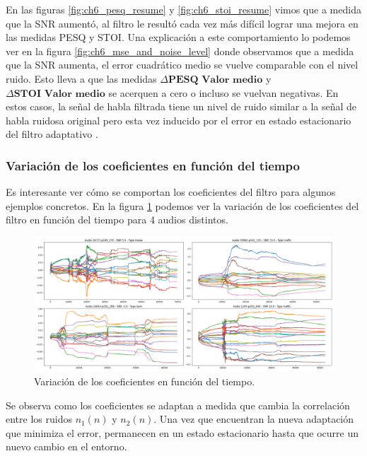En las figuras \ref{fig:ch6_pesq_resume} y \ref{fig:ch6_stoi_resume} vimos que a medida que la SNR aumentó, al filtro le resultó cada vez más difícil lograr una mejora en las medidas PESQ y STOI. Una explicación a este comportamiento lo podemos ver en la figura \ref{fig:ch6_mse_and_noise_level} donde observamos que a medida que la SNR aumenta, el error cuadrático medio se vuelve comparable con el nivel ruido. Esto lleva a que las medidas $\Delta \textbf{PESQ Valor medio}$ y $\Delta \textbf{STOI Valor medio}$ se acerquen a cero o incluso se vuelvan negativas. En estos casos, la señal de habla filtrada tiene un nivel de ruido similar a la señal de habla ruidosa original pero esta vez inducido por el error en estado estacionario del filtro adaptativo \cite{fundamentals_of_adaptive_filtering}.

\subsubsection{Variación de los coeficientes en función del tiempo}

Es interesante ver cómo se comportan los coeficientes del filtro para algunos ejemplos concretos. En la figura \ref{fig:ch6_variacion_temporal_de_coeficientes}  podemos ver la variación de los coeficientes del filtro en función del tiempo para 4 audios distintos. 

\begin{figure}
	\centering
	\centerline{\includegraphics[scale=0.35]{images/ch6/af/weights/weights.png}}
	\caption{Variación de los coeficientes en función del tiempo.}
	\label{fig:ch6_variacion_temporal_de_coeficientes}
\end{figure}

Se observa como los coeficientes se adaptan a medida que cambia la correlación entre los ruidos $n_1(n)$ y $n_2(n)$. Una vez que encuentran la nueva adaptación que minimiza el error, permanecen en un estado estacionario hasta que ocurre un nuevo cambio en el entorno.


